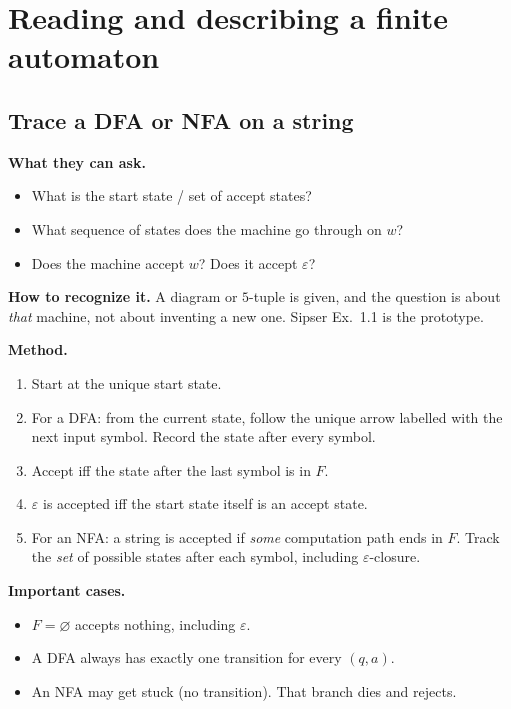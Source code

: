 \documentclass[11pt,a4paper]{article}
\newcommand{\eps}{\varepsilon}
\begin{document}
\section{Reading and describing a finite automaton}
\label{type:dfa-read}

\subsection{Trace a DFA or NFA on a string}

\textbf{What they can ask.}
\begin{itemize}[nosep]
  \item What is the start state / set of accept states?
  \item What sequence of states does the machine go through on $w$?
  \item Does the machine accept $w$? Does it accept $\eps$?
\end{itemize}

\textbf{How to recognize it.}
A diagram or $5$-tuple is given, and the question is about \emph{that}
machine, not about inventing a new one. Sipser Ex.~1.1 is the prototype.

\textbf{Method.}
\begin{enumerate}
  \item Start at the unique start state.
  \item For a DFA: from the current state, follow the unique arrow labelled
        with the next input symbol. Record the state after every symbol.
  \item Accept iff the state after the last symbol is in $F$.
  \item $\eps$ is accepted iff the start state itself is an accept state.
  \item For an NFA: a string is accepted if \emph{some} computation path
        ends in $F$. Track the \emph{set} of possible states after each
        symbol, including $\eps$-closure.
\end{enumerate}

\textbf{Important cases.}
\begin{itemize}[nosep]
  \item $F=\varnothing$ accepts nothing, including $\eps$.
  \item A DFA always has exactly one transition for every $(q,a)$.
  \item An NFA may get stuck (no transition). That branch dies and rejects.
\end{itemize}
\end{document}
